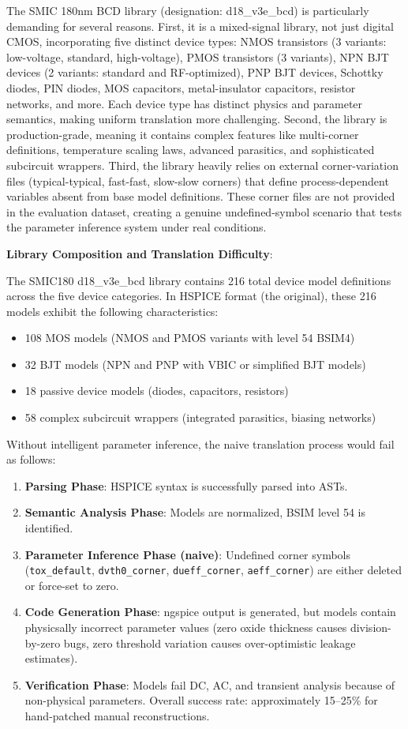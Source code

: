 \documentclass[conference]{IEEEtran}
\begin{document}
The SMIC 180nm BCD library (designation: d18\_v3e\_bcd) is particularly demanding for several reasons. First, it is a mixed-signal library, not just digital CMOS, incorporating five distinct device types: NMOS transistors (3 variants: low-voltage, standard, high-voltage), PMOS transistors (3 variants), NPN BJT devices (2 variants: standard and RF-optimized), PNP BJT devices, Schottky diodes, PIN diodes, MOS capacitors, metal-insulator capacitors, resistor networks, and more. Each device type has distinct physics and parameter semantics, making uniform translation more challenging. Second, the library is production-grade, meaning it contains complex features like multi-corner definitions, temperature scaling laws, advanced parasitics, and sophisticated subcircuit wrappers. Third, the library heavily relies on external corner-variation files (typical-typical, fast-fast, slow-slow corners) that define process-dependent variables absent from base model definitions. These corner files are not provided in the evaluation dataset, creating a genuine undefined-symbol scenario that tests the parameter inference system under real conditions.

\textbf{Library Composition and Translation Difficulty}:

The SMIC180 d18\_v3e\_bcd library contains 216 total device model definitions across the five device categories. In HSPICE format (the original), these 216 models exhibit the following characteristics:
\begin{itemize}
\item 108 MOS models (NMOS and PMOS variants with level 54 BSIM4)
\item 32 BJT models (NPN and PNP with VBIC or simplified BJT models)
\item 18 passive device models (diodes, capacitors, resistors)
\item 58 complex subcircuit wrappers (integrated parasitics, biasing networks)
\end{itemize}

Without intelligent parameter inference, the naive translation process would fail as follows:
\begin{enumerate}
\item \textbf{Parsing Phase}: HSPICE syntax is successfully parsed into ASTs.
\item \textbf{Semantic Analysis Phase}: Models are normalized, BSIM level 54 is identified.
\item \textbf{Parameter Inference Phase (naive)}: Undefined corner symbols (\texttt{tox\_default}, \texttt{dvth0\_corner}, \texttt{dueff\_corner}, \texttt{aeff\_corner}) are either deleted or force-set to zero.
\item \textbf{Code Generation Phase}: ngspice output is generated, but models contain physicsally incorrect parameter values (zero oxide thickness causes division-by-zero bugs, zero threshold variation causes over-optimistic leakage estimates).
\item \textbf{Verification Phase}: Models fail DC, AC, and transient analysis because of non-physical parameters. Overall success rate: approximately 15--25\% for hand-patched manual reconstructions.
\end{enumerate}
\end{document}
